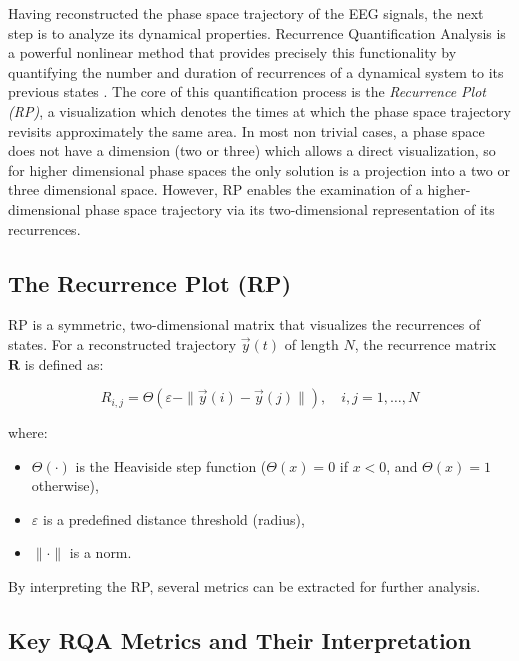 \documentclass{article}
\begin{document}
				Having reconstructed the phase space trajectory of the EEG signals, 
				the next step is to analyze its dynamical properties. 
				Recurrence Quantification Analysis is a powerful nonlinear method that 
				provides precisely this functionality by quantifying the number and duration 
				of recurrences of a dynamical system to its previous states \cite{theoryReviewRQA}. 
				The core of this quantification process is the \emph{Recurrence Plot (RP)}, 
				a visualization which denotes the times at which the phase space 
				trajectory revisits approximately the same area.
				In most non trivial cases, a phase space  does not have a dimension (two or three)
				which allows a direct visualization, so for higher dimensional phase spaces 
				the only solution is a projection into a two or three dimensional space. 
				However, RP enables the examination of a higher-dimensional phase space trajectory 
				via its two-dimensional representation of its recurrences.

				\subsection{The Recurrence Plot (RP)}

				RP is a symmetric, two-dimensional matrix that visualizes the recurrences of states.
				For a reconstructed trajectory \(\vec{y}(t)\) of length \(N\), 
				the recurrence matrix \(\mathbf{R}\) is defined as:

				\begin{equation}
				R_{i,j} = \Theta(\varepsilon - \|\vec{y}(i) - \vec{y}(j)\|), \quad i,j = 1, \ldots, N
				\end{equation}

				where:
				\begin{itemize}
				    \item \(\Theta(\cdot)\) is the Heaviside step function (\(\Theta(x)=0\) if \(x<0\), and \(\Theta(x)=1\) otherwise),
				    \item \(\varepsilon\) is a predefined distance threshold (radius),
				    \item \(\|\cdot\|\) is a norm.
				\end{itemize}
	
				By interpreting the RP, several metrics can be extracted for further analysis.
				
				\subsection{Key RQA Metrics and Their Interpretation}
					\label{subsec:rqa_metrics}
\end{document}
